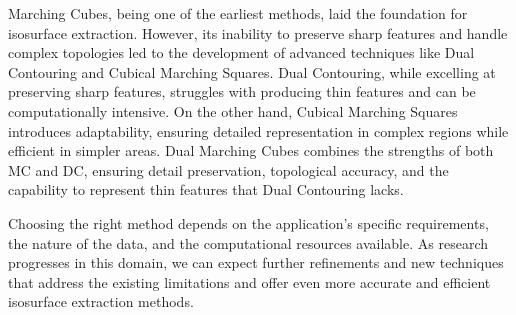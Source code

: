 Marching Cubes, being one of the earliest methods, laid the foundation for isosurface extraction. However, its inability to preserve sharp features and handle complex topologies led to the development of advanced techniques like Dual Contouring and Cubical Marching Squares. Dual Contouring, while excelling at preserving sharp features, struggles with producing thin features and can be computationally intensive. On the other hand, Cubical Marching Squares introduces adaptability, ensuring detailed representation in complex regions while efficient in simpler areas. Dual Marching Cubes combines the strengths of both MC and DC, ensuring detail preservation, topological accuracy, and the capability to represent thin features that Dual Contouring lacks.

Choosing the right method depends on the application's specific requirements, the nature of the data, and the computational resources available. As research progresses in this domain, we can expect further refinements and new techniques that address the existing limitations and offer even more accurate and efficient isosurface extraction methods.